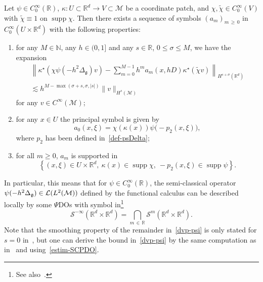 \documentclass[AHL,Unicode,longabstracts,published]{cedram}
\newcommand{\R}{\mathbb{R}}
\newcommand{\N}{\mathbb{N}}
\DeclareMathOperator*{\supp}{supp}
\renewcommand{\L}{\mathcal{L}}
\renewcommand{\S}{\mathcal{S}}
\newcommand{\M}{\mathcal{M}}
\newcommand{\g}{\mathfrak{g}}
\newcommand{\Dlg}{\Delta_{\g}}
\newcommand{\kk}{\kappa}
\newcommand{\s}{\sigma}
\newcommand{\wt}{\widetilde}
\newcommand{\les}{\lesssim}
\newcommand*{\romanenumi}{\renewcommand*{\theenumi}{\roman{enumi}}}
\begin{document}
\begin{prop}\label{prop-dvp}
Let $\psi\in C^{\infty}_0(\R)$, $\kk: U\subset \R^d\rightarrow V\subset \M$ be a coordinate patch, and $\chi,\widetilde{\chi}\in C^{\infty}_0(V)$ with $\widetilde{\chi}\equiv 1$ on $\supp\chi$. Then there exists a sequence of symbols $(a_m)_{m\,\geq\,0}$ in $C^{\infty}_0(U\times\R^d)$ with the following properties:
\begin{enumerate}\romanenumi
\item\label{prop2.2.i} for any $M\in\N$, any $h\in (0,1]$ and any $s\in\R$, $0\le \s \le M$, we have the expansion
\begin{multline}\label{dvp-psi}
\left\|\kk^{\star}\left(\chi\psi\left(-h^2\Dlg\right)v\right) - \sum_{m=0}^{M-1}h^ma_m(x,hD)\kk^\star(\wt\chi v)\right\|_{H^ {s+\s}\left(\R^d\right)}\\
 \les h^{M-\max(\s+s,\s,|s|)}\|v\|_{H^s(\M)}
\end{multline}
for any $v\in C^{\infty}(\M)$;
\item\label{prop2.2.ii} for any $x\in U$ the principal symbol is given by
\begin{equation*}
a_0(x,\xi)= \chi(\kk(x))\psi\big(-p_2(x,\xi)\big),
\end{equation*}
where $p_2$ has been defined in~\eqref{def-psDelta};
 
\item\label{prop2.2.iii} for all $m\geq 0$, $a_m$ is supported in
\begin{equation}\label{support}
\left\{(x,\xi)\in U\times\R^d,~\kk(x)\in\supp\chi,~-p_2(x,\xi)\in \supp \psi\right\}.
\end{equation}
\end{enumerate}
\end{prop}

In particular, this means that for $\psi\in C^{\infty}_0(\R)$, the semi-classical operator $\psi(-h^2\Dlg)\linebreak\in\L(L^2(\M))$ defined by the functional calculus can be described locally by some $\Psi$DOs with symbol in\footnote{See also~\cite[Section~14.3.2]{Zworski}.}
\begin{equation*}
\S^{-\infty}\left(\R^d\times\R^d\right)=\bigcap_{m\,\in\,\R}\S^m\left(\R^d\times\R^d\right).
\end{equation*}
Note that the smoothing property of the remainder in~\eqref{dvp-psi} is only stated for $s=0$ in~\cite[Proposition~2.1]{BGT}, but one can derive the bound in~\eqref{dvp-psi} by the same computation as in~\cite{BGT} and using~\eqref{estim-SCPDO}.
\end{document}
